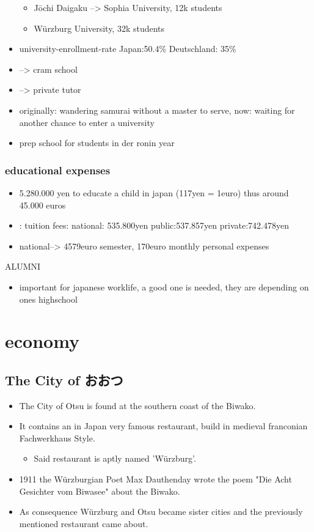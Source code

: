 \documentclass{article}
\newcommand\tab[1][1cm]{\hspace*{#1}}
\newcommand\tabi[1][0.05cm]{\hspace*{#1}}
\newcommand\tabni[1][0.2cm]{\hspace*{#1}}
\newcommand\tabroku[1][0.6cm]{\hspace*{#1}}
\begin{document}
\begin{itemize}
\begin{itemize}
\item {} Jōchi Daigaku --> Sophia University, 12k students 
\item Würzburg University, 32k students
\end{itemize}
\item {} \tabi university-enrollment-rate \tabroku Japan:50.4\% \tab Deutschland: 35\%
\item {} \tabi --> cram school
\item {} \tabi --> private tutor
\item {} \tabi originally: wandering samurai without a master to serve, now: waiting for another chance to enter a university
\item {} prep school for students in der ronin year
\end{itemize}
\subsubsection{ \tabi educational expenses}
\begin{itemize}
\item 5.280.000 yen to educate a child in japan (117yen = 1euro) thus around 45.000 euros
\item {}: tuition fees: national: 535.800yen \tabi public:537.857yen \tabi private:742.478yen
\item national--> 4579euro semester, 170euro monthly personal expenses  
\end{itemize}
 \tabi ALUMNI
\begin{itemize}
\item important for japanese worklife, a good one is needed, they are depending on ones highschool
\end{itemize}
\section{ \tabni economy}
\subsection{The City of おおつ}
\begin{itemize}
\item The City of Otsu is found at the southern coast of the Biwako.
\item It contains an in Japan very famous restaurant, build in medieval franconian Fachwerkhaus Style.
\begin{itemize}
\item Said restaurant is aptly named 'Würzburg'.
\end{itemize}
\item 1911 the Würzburgian Poet Max Dauthenday wrote the poem "Die Acht Gesichter vom Biwasee" about the Biwako.
\item As consequence Würzburg and Otsu became sister cities and the previously mentioned restaurant came about. 
\end{itemize}
\end{document}
